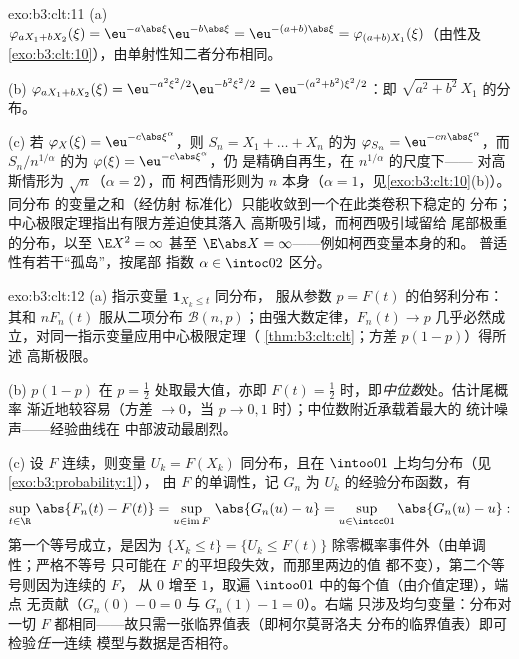 \begin{solution}{exo:b3:clt:11}
(a) $\varphi_{aX_1 + bX_2}(\xi) =
\eu^{-a\abs\xi}\eu^{-b\abs\xi} = \eu^{-(a+b)\abs\xi} =
\varphi_{(a+b)X_1}(\xi)$（由性及
\cref{exo:b3:clt:10}），由单射性知二者分布相同。

(b) $\varphi_{aX_1+bX_2}(\xi) = \eu^{-a^2\xi^2/2}
\eu^{-b^2\xi^2/2} = \eu^{-(a^2+b^2)\xi^2/2}$：即
$\sqrt{a^2+b^2}\,X_1$ 的分布。

(c) 若 $\varphi_X(\xi) = \eu^{-c\abs\xi^\alpha}$，则
$S_n = X_1 + \dots + X_n$ 的为 $\varphi_{S_n} =
\eu^{-cn\abs\xi^\alpha}$，而 $S_n/n^{1/\alpha}$ 的为
$\varphi(\xi) = \eu^{-c\abs\xi^\alpha}$，仍
是精确自再生，在 $n^{1/\alpha}$ 的尺度下——
对高斯情形为 $\sqrt n$（$\alpha = 2$），而
柯西情形则为 $n$ 本身（$\alpha = 1$，见\cref{exo:b3:clt:10}(b)）。同分布
的变量之和（经仿射
标准化）只能收敛到一个在此类卷积下稳定的
分布；中心极限定理指出有限方差迫使其落入
高斯吸引域，而柯西吸引域留给
尾部极重的分布，以至 $\E X^2 = \infty$ 甚至 $\E\abs
X = \infty$——例如柯西变量本身的和。
普适性有若干“孤岛”，按尾部
指数 $\alpha \in \intoc02$ 区分。
\end{solution}

\begin{solution}{exo:b3:clt:12}
(a) 指示变量 $\mathbf 1_{X_k \leq t}$ 同分布，
服从参数 $p = F(t)$ 的伯努利分布：其和 $nF_n(t)$
服从二项分布 $\mathcal B(n, p)$；由强大数定律，$F_n(t)
\to p$ 几乎必然成立，对同一指示变量应用中心极限定理（
\cref{thm:b3:clt:clt}；方差 $p(1-p)$）得所述
高斯极限。

(b) $p(1 - p)$ 在 $p = \frac12$ 处取最大值，亦即
$F(t) = \frac12$ 时，即\emph{中位数}处。估计尾概率
渐近地较容易（方差 $\to 0$，当
$p \to 0, 1$ 时）；中位数附近承载着最大的
统计噪声——经验曲线在
中部波动最剧烈。

(c) 设 $F$ 连续，则变量 $U_k = F(X_k)$
同分布，且在 $\intoo01$ 上均匀分布（见\cref{exo:b3:probability:1}），
由 $F$ 的单调性，记 $G_n$ 为
$U_k$ 的经验分布函数，有
\[
\sup_{t\in\R}\,\abs{F_n(t) - F(t)}
= \sup_{u \in \operatorname{im}F}\,\abs{G_n(u) - u}
= \sup_{u\in\intcc01}\abs{G_n(u) - u} :
\]
第一个等号成立，是因为 $\{X_k \leq t\} = \{U_k \leq
F(t)\}$ 除零概率事件外（由单调性；严格不等号
只可能在 $F$ 的平坦段失效，而那里两边的值
都不变），第二个等号则因为连续的 $F$，
从 $0$ 增至 $1$，取遍
$\intoo01$ 中的每个值（由介值定理），端点
无贡献（$G_n(0) - 0 = 0$ 与 $G_n(1) - 1 = 0$）。右端
只涉及均匀变量：分布对一切
$F$ 都相同——故只需一张临界值表（即柯尔莫哥洛夫
分布的临界值表）即可检验\emph{任一}连续
模型与数据是否相符。
\end{solution}

